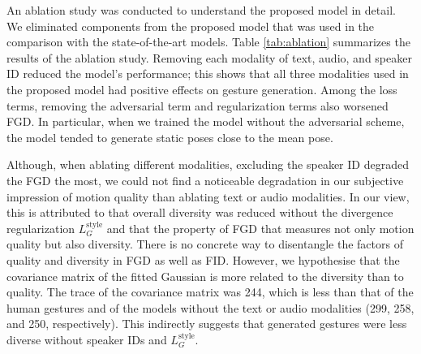 \documentclass[acmtog]{acmart}
\begin{document}
An ablation study was conducted to understand the proposed model in detail. We eliminated components from the proposed model that was used in the comparison with the state-of-the-art models. Table \ref{tab:ablation} summarizes the results of the ablation study. Removing each modality of text, audio, and speaker ID reduced the model's performance; this shows that all three modalities used in the proposed model had positive effects on gesture generation. Among the loss terms, removing the adversarial term and regularization terms also worsened FGD. In particular, when we trained the model without the adversarial scheme, the model tended to generate static poses close to the mean pose.

Although, when ablating different modalities, excluding the speaker ID degraded the FGD the most, we could not find a noticeable degradation in our subjective impression of motion quality than ablating text or audio modalities. In our view, this is attributed to that overall diversity was reduced without the divergence regularization $L_G^\textrm{style}$ and that the property of FGD that measures not only motion quality but also diversity. There is no concrete way to disentangle the factors of quality and diversity in FGD as well as FID. However, we hypothesise that the covariance matrix of the fitted Gaussian is more related to the diversity than to quality. The trace of the covariance matrix was 244, which is less than that of the human gestures and of the models without the text or audio modalities (299, 258, and 250, respectively). This indirectly suggests that generated gestures were less diverse without speaker IDs and $L_G^\textrm{style}$.
\end{document}
